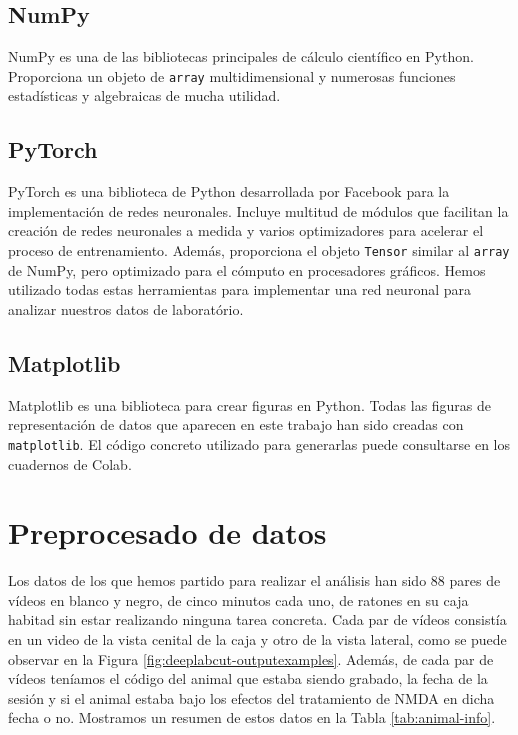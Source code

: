 \subsection*{NumPy}
NumPy es una de las bibliotecas principales de cálculo científico en Python. Proporciona un objeto de \texttt{array} multidimensional y numerosas funciones estadísticas y algebraicas de mucha utilidad.

\subsection*{PyTorch}
PyTorch \cite{pytorch-paper} es una biblioteca de Python desarrollada por Facebook para la implementación de redes neuronales. Incluye multitud de módulos que facilitan la creación de redes neuronales a medida y varios optimizadores para acelerar el proceso de entrenamiento. Además, proporciona el objeto \texttt{Tensor} similar al \texttt{array} de NumPy, pero optimizado para el cómputo en procesadores gráficos. Hemos utilizado todas estas herramientas para implementar una red neuronal para analizar nuestros datos de laboratório.

\subsection*{Matplotlib}
Matplotlib es una biblioteca para crear figuras en Python. Todas las figuras de representación de datos que aparecen en este trabajo han sido creadas con \texttt{matplotlib}. El código concreto utilizado para generarlas puede consultarse en los cuadernos de Colab.

\section{Preprocesado de datos} \label{sec:preprocesado}

Los datos de los que hemos partido para realizar el análisis han sido 88 pares de vídeos en blanco y negro, de cinco minutos cada uno, de ratones en su caja habitad sin estar realizando ninguna tarea concreta. Cada par de vídeos consistía en un video de la vista cenital de la caja y otro de la vista lateral, como se puede observar en la Figura \ref{fig:deeplabcut-outputexamples}. Además, de cada par de vídeos teníamos el código del animal que estaba siendo grabado, la fecha de la sesión y si el animal estaba bajo los efectos del tratamiento de NMDA en dicha fecha o no. Mostramos un resumen de estos datos en la Tabla \ref{tab:animal-info}.

